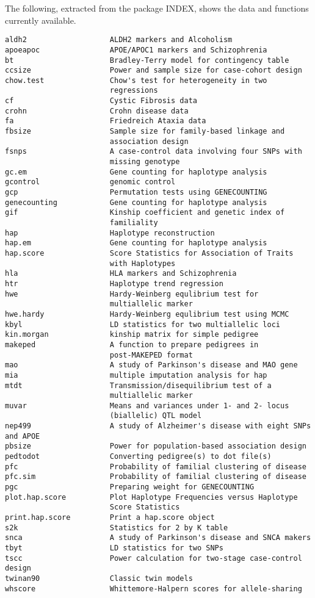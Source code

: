 \documentclass[11pt,a4paper]{article}
\begin{document}
The following, extracted from the package INDEX, shows the data and functions
currently available.

\begin{verbatim}
aldh2                   ALDH2 markers and Alcoholism
apoeapoc                APOE/APOC1 markers and Schizophrenia
bt                      Bradley-Terry model for contingency table
ccsize                  Power and sample size for case-cohort design
chow.test               Chow's test for heterogeneity in two
                        regressions
cf                      Cystic Fibrosis data
crohn                   Crohn disease data
fa                      Friedreich Ataxia data
fbsize                  Sample size for family-based linkage and
                        association design
fsnps                   A case-control data involving four SNPs with
                        missing genotype
gc.em                   Gene counting for haplotype analysis
gcontrol                genomic control
gcp                     Permutation tests using GENECOUNTING
genecounting            Gene counting for haplotype analysis
gif                     Kinship coefficient and genetic index of
                        familiality
hap                     Haplotype reconstruction
hap.em                  Gene counting for haplotype analysis
hap.score               Score Statistics for Association of Traits
                        with Haplotypes
hla                     HLA markers and Schizophrenia
htr                     Haplotype trend regression
hwe                     Hardy-Weinberg equlibrium test for
                        multiallelic marker
hwe.hardy               Hardy-Weinberg equlibrium test using MCMC
kbyl                    LD statistics for two multiallelic loci
kin.morgan              kinship matrix for simple pedigree
makeped                 A function to prepare pedigrees in
                        post-MAKEPED format
mao                     A study of Parkinson's disease and MAO gene
mia                     multiple imputation analysis for hap
mtdt                    Transmission/disequilibrium test of a
                        multiallelic marker
muvar                   Means and variances under 1- and 2- locus
                        (biallelic) QTL model
nep499                  A study of Alzheimer's disease with eight SNPs and APOE
pbsize                  Power for population-based association design
pedtodot                Converting pedigree(s) to dot file(s)
pfc                     Probability of familial clustering of disease
pfc.sim                 Probability of familial clustering of disease
pgc                     Preparing weight for GENECOUNTING
plot.hap.score          Plot Haplotype Frequencies versus Haplotype
                        Score Statistics
print.hap.score         Print a hap.score object
s2k                     Statistics for 2 by K table
snca                    A study of Parkinson's disease and SNCA makers
tbyt                    LD statistics for two SNPs
tscc                    Power calculation for two-stage case-control design
twinan90                Classic twin models
whscore                 Whittemore-Halpern scores for allele-sharing
\end{verbatim}
\end{document}
